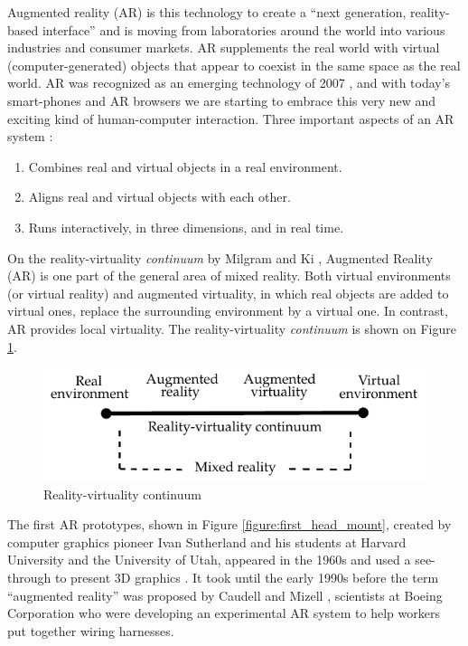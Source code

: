 Augmented reality (AR) is this technology to create a ``next generation, reality-based interface'' \cite{Krevelen2010} and is moving from laboratories around the world into various industries and consumer markets. AR supplements the real world with virtual (computer-generated) objects that appear to coexist in the same space as the real world. AR was recognized as an emerging technology of 2007 \cite{Krevelen2010}, and with today's smart-phones and AR browsers we are starting to embrace this very new and exciting kind of human-computer interaction. Three important aspects of an AR system \cite{Benford1998}:

\begin{enumerate}
  \item Combines real and virtual objects in a real environment.
  \item Aligns real and virtual objects with each other.
  \item Runs interactively, in three dimensions, and in real time.
\end{enumerate}

On the reality-virtuality \textit{continuum} by Milgram and Ki \cite{Mistry2009}, Augmented Reality (AR) is one part of the general area of mixed reality. Both virtual environments (or virtual reality) and augmented virtuality, in which real objects are added to virtual ones, replace the surrounding environment by a virtual one. In contrast, AR provides local virtuality. The reality-virtuality \textit{continuum} is shown on Figure \ref{figure:reality_continuum}.

\begin{figure}[!htb]
  \centering
  \includegraphics{chapters/basic_concepts/reality_continuum.pdf}
  \caption{Reality-virtuality continuum}
  \label{figure:reality_continuum}
\end{figure}

The first AR prototypes, shown in Figure \ref{figure:first_head_mount}, created by computer graphics pioneer Ivan Sutherland and his students at Harvard University and the University of Utah, appeared in the 1960s and used a see-through to present 3D graphics \cite{Benford1998}. It took until the early 1990s before the term ``augmented reality'' was proposed by Caudell and Mizell \cite{Benford1998}, scientists at Boeing Corporation who were developing an experimental AR system to help workers put together wiring harnesses.


